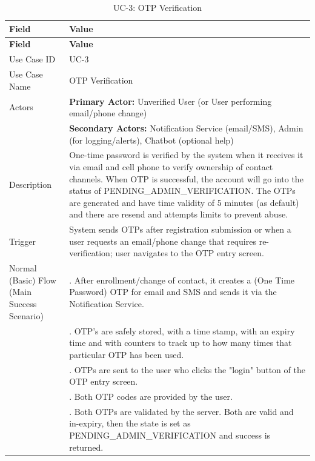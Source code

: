 \begin{longtable}{|>{\raggedright\arraybackslash}p{4cm}|>{\raggedright\arraybackslash}p{11cm}|}
\caption{UC-3: OTP Verification}
\label{tab:uc-3} \\
\hline
\rowcolor{lightgray!30}
\textbf{Field} & \textbf{Value} \\
\hline
\endfirsthead
\hline
\rowcolor{lightgray!30}
\textbf{Field} & \textbf{Value} \\
\hline
\endhead
\hline
\endfoot
\hline
\endlastfoot
Use Case ID & UC-3 \\
\hline
Use Case Name & OTP Verification \\
\hline
Actors & \textbf{Primary Actor:} Unverified User (or User performing email/phone change) \\
& \textbf{Secondary Actors:} Notification Service (email/SMS), Admin (for logging/alerts), Chatbot (optional help) \\
\hline
Description & One-time password is verified by the system when it receives it via email and cell phone to verify ownership of contact channels. When OTP is successful, the account will go into the status of PENDING_ADMIN_VERIFICATION. The OTPs are generated and have time validity of 5 minutes (as default) and there are resend and attempts limits to prevent abuse. \\
\hline
Trigger & System sends OTPs after registration submission or when a user requests an email/phone change that requires re-verification; user navigates to the OTP entry screen. \\
\hline
Normal (Basic) Flow (Main Success Scenario) & 1. After enrollment/change of contact, it creates a (One Time Password) OTP for email and SMS and sends it via the Notification Service. \\
& 2. OTP's are safely stored, with a time stamp, with an expiry time and with counters to track up to how many times that particular OTP has been used. \\
& 3. OTPs are sent to the user who clicks the "login" button of the OTP entry screen. \\
& 4. Both OTP codes are provided by the user. \\
& 5. Both OTPs are validated by the server. Both are valid and in-expiry, then the state is set as PENDING_ADMIN_VERIFICATION and success is returned. \\

\end{longtable}
